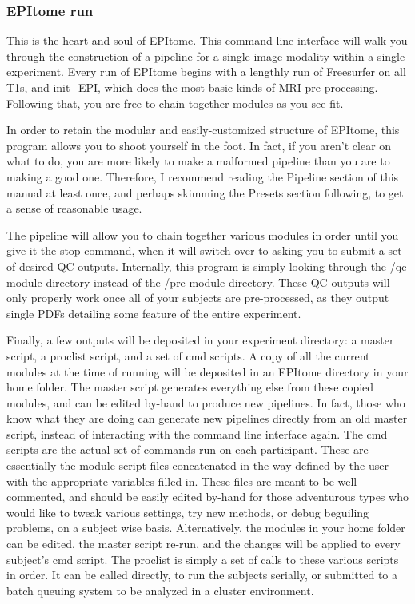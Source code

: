 \documentclass[final,titlepage,letterpaper,oneside,12pt]{article}
\renewcommand{\texttt}[2][BrickRed]{\textcolor{#1}{\ttfamily #2}}%
\begin{document}
\subsubsection{EPItome run}

This is the heart and soul of \texttt{EPItome}. This command line interface will walk you through the construction of a pipeline for a single image modality within a single experiment. Every run of EPItome begins with a lengthly run of Freesurfer on all T1s, and \texttt{init\_EPI}, which does the most basic kinds of MRI pre-processing. Following that, you are free to chain together modules as you see fit.

In order to retain the modular and easily-customized structure of EPItome, this program allows you to shoot yourself in the foot. In fact, if you aren't clear on what to do, you are more likely to make a malformed pipeline than you are to making a good one. Therefore, I recommend reading the Pipeline section of this manual at least once, and perhaps skimming the Presets section following, to get a sense of reasonable usage.

The pipeline will allow you to chain together various modules in order until you give it the \texttt{stop} command, when it will switch over to asking you to submit a set of desired QC outputs. Internally, this program is simply looking through the \texttt{/qc} module directory instead of the \texttt{/pre} module directory. These QC outputs will only properly work once all of your subjects are pre-processed, as they output single PDFs detailing some feature of the entire experiment.

Finally, a few outputs will be deposited in your experiment directory: a \texttt{master} script, a \texttt{proclist} script, and a set of \texttt{cmd} scripts. A copy of all the current modules at the time of running will be deposited in an \texttt{EPItome} directory in your home folder. The \texttt{master} script generates everything else from these copied modules, and can be edited by-hand to produce new pipelines. In fact, those who know what they are doing can generate new pipelines directly from an old \texttt{master} script, instead of interacting with the command line interface again. The \texttt{cmd} scripts are the actual set of commands run on each participant. These are essentially the module script files concatenated in the way defined by the user with the appropriate variables filled in. These files are meant to be well-commented, and should be easily edited by-hand for those adventurous types who would like to tweak various settings, try new methods, or debug beguiling problems, on a subject wise basis. Alternatively, the modules in your home folder can be edited, the master script re-run, and the changes will be applied to every subject's \texttt{cmd} script. The \texttt{proclist} is simply a set of calls to these various scripts in order. It can be called directly, to run the subjects serially, or submitted to a batch queuing system to be analyzed in a cluster environment.
\end{document}
